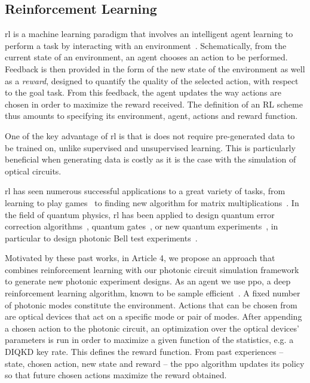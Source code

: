 \subsection{Reinforcement Learning}

\acrfull{rl} is a machine learning paradigm that involves an intelligent agent learning to perform a task by interacting with an environment~\cite{Sutton2018}.
Schematically, from the current state of an environment, an agent chooses an action to be performed.
Feedback is then provided in the form of the new state of the environment as well as a \textit{reward}, designed to quantify the quality of the selected action, with respect to the goal task.
From this feedback, the agent updates the way actions are chosen in order to maximize the reward received. 
The definition of an RL scheme thus amounts to specifying its environment, agent, actions and reward function. 

One of the key advantage of \acrshort{rl} is that is does not require pre-generated data to be trained on, unlike supervised and unsupervised learning.
This is particularly beneficial when generating data is costly as it is the case with the simulation of optical circuits.

\medbreak

\acrshort{rl} has seen numerous successful applications to a great variety of tasks, from learning to play games~\cite{Mnih2015,Silver2017,Vinyals2019} to finding new algorithm for matrix multiplications~\cite{Fawzi2022}.
In the field of quantum physics, \acrshort{rl} has been applied to design quantum error correction algorithms~\cite{Andreasson2019,Nautrup2019,Sweke2020}, quantum gates~\cite{Niu2019}, or new quantum experiments~\cite{Melnikov2018,Krenn2016,Krenn2020,Krenn2021}, in particular to design photonic Bell test experiments~\cite{Melnikov2020}.

Motivated by these past works, in Article 4, we propose an approach that combines reinforcement learning with our photonic circuit simulation framework to generate new photonic experiment designs.
As an agent we use \acrfull{ppo}, a deep reinforcement learning algorithm, known to be sample efficient~\cite{Schulman2017}.
A fixed number of photonic modes constitute the environment.
Actions that can be chosen from are optical devices that act on a specific mode or pair of modes.
After appending a chosen action to the photonic circuit, an optimization over the optical devices' parameters is run in order to maximize a given function of the statistics, e.g. a DIQKD key rate.
This defines the reward function.
From past experiences -- state, chosen action, new state and reward -- the \acrshort{ppo} algorithm updates its policy so that future chosen actions maximize the reward obtained.


